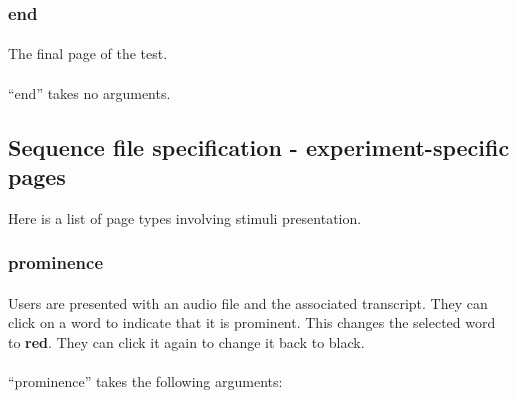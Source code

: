 \subsubsection{end}

\paragraph{}
The final page of the test.  

\paragraph{}
``end'' takes no arguments.


\subsection{Sequence file specification - experiment-specific pages}
\label{sec:sequenceSpecSpecific}

Here is a list of page types involving stimuli presentation.  


\subsubsection{prominence}

\paragraph{}
Users are presented with an audio file and the associated transcript.  They can click on a word to indicate that it is prominent.  This changes the selected word to \textbf{red}.  They can click it again to change it back to black.

\paragraph{}
``prominence'' takes the following arguments:


